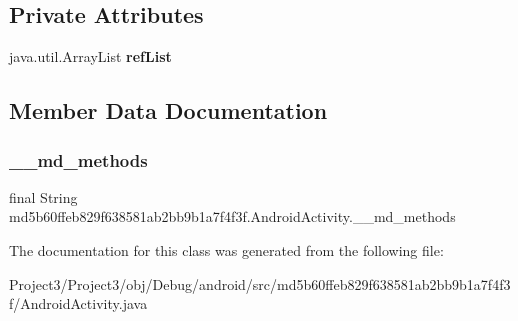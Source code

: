\subsection*{Private Attributes}
\begin{DoxyCompactItemize}
\item 
\mbox{\label{classmd5b60ffeb829f638581ab2bb9b1a7f4f3f_1_1AndroidActivity_a5c1d60bfbc05ceae734119d4d979b8cc}} 
java.\+util.\+Array\+List {\bfseries ref\+List}
\end{DoxyCompactItemize}


\subsection{Member Data Documentation}
\mbox{\label{classmd5b60ffeb829f638581ab2bb9b1a7f4f3f_1_1AndroidActivity_a96cef65bd666995b23bcd03497dea337}} 
\subsubsection{\texorpdfstring{\+\_\+\+\_\+md\+\_\+methods}{\_\_md\_methods}}
{\footnotesize\ttfamily final String md5b60ffeb829f638581ab2bb9b1a7f4f3f.\+Android\+Activity.\+\_\+\+\_\+md\+\_\+methods\hspace{0.3cm}{\ttfamily [static]}}



The documentation for this class was generated from the following file\+:\begin{DoxyCompactItemize}
\item 
Project3/\+Project3/obj/\+Debug/android/src/md5b60ffeb829f638581ab2bb9b1a7f4f3f/Android\+Activity.\+java\end{DoxyCompactItemize}
